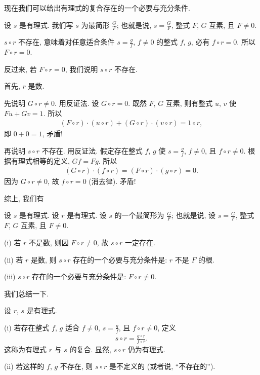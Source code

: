 现在我们可以给出有理式的复合存在的一个必要与充分条件.

设 $s$ 是有理式. 我们写 $s$ 为最简形 $\frac{G}{F}$; 也就是说, $s = \frac{G}{F}$, 整式 $F$, $G$ 互素, 且 $F \neq 0$.

$s \circ r$ 不存在, 意味着对任意适合条件 $s = \frac{g}{f}$, $f \neq 0$ 的整式 $f$, $g$, 必有 $f \circ r = 0$. 所以 $F \circ r = 0$.

反过来, 若 $F \circ r = 0$, 我们说明 $s \circ r$ 不存在.

首先, $r$ 是数.

先说明 $G \circ r \neq 0$. 用反证法. 设 $G \circ r = 0$. 既然 $F$, $G$ 互素, 则有整式 $u$, $v$ 使 $Fu + Gv = 1$. 所以
\begin{align*}
    (F \circ r) \cdot (u \circ r) + (G \circ r) \cdot (v \circ r) = 1 \circ r,
\end{align*}
即 $0 + 0 = 1$, 矛盾!

再说明 $s \circ r$ 不存在. 用反证法. 假定存在整式 $f$, $g$ 使 $s = \frac{g}{f}$, $f \neq 0$, 且 $f \circ r \neq 0$. 根据有理式相等的定义, $Gf = Fg$. 所以
\begin{align*}
    (G \circ r) \cdot (f \circ r) = (F \circ r) \cdot (g \circ r) = 0.
\end{align*}
因为 $G \circ r \neq 0$, 故 $f \circ r = 0$ (消去律). 矛盾!

综上, 我们有
\begin{proposition}
    设 $s$ 是有理式. 设 $r$ 是有理式. 设 $s$ 的一个最简形为 $\frac{G}{F}$; 也就是说, 设 $s = \frac{G}{F}$, 整式 $F$, $G$ 互素, 且 $F \neq 0$.

    (i) 若 $r$ 不是数, 则因 $F \circ r \neq 0$, 故 $s \circ r$ 一定存在.

    (ii) 若 $r$ 是数, 则 $s \circ r$ 存在的一个必要与充分条件是: $r$ 不是 $F$ 的根.

    (iii) $s \circ r$ 存在的一个必要与充分条件是: $F \circ r \neq 0$.
\end{proposition}

我们总结一下.

\begin{definition}
    设 $r$, $s$ 是有理式.

    (i) 若存在整式 $f$, $g$ 适合 $f \neq 0$, $s = \frac{g}{f}$, 且 $f \circ r \neq 0$, 定义
    \begin{align*}
        s \circ r = \frac{g \circ r}{f \circ r}.
    \end{align*}
    这称为有理式 $r$ 与 $s$ 的复合. 显然, $s \circ r$ 仍为有理式.

    (ii) 若这样的 $f$, $g$ 不存在, 则 $s \circ r$ 是不定义的 (或者说, ``不存在的'').
\end{definition}

